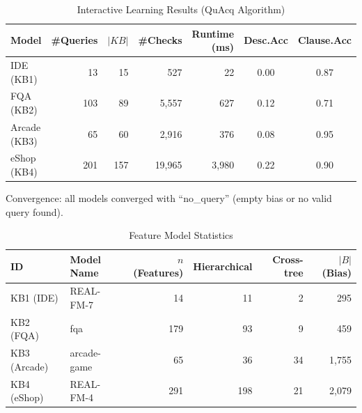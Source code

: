 \begin{table}[htbp]
\centering
\caption{Interactive Learning Results (QuAcq Algorithm)}
\label{tab:interactive}
\begin{tabular}{l|rrrr|cc}
\toprule
\textbf{Model} & \textbf{\#Queries} & \textbf{$|KB|$} & \textbf{\#Checks} & \textbf{Runtime (ms)}
    & \textbf{Desc.Acc} & \textbf{Clause.Acc} \\
\midrule
IDE (KB1)    & 13  & 15  & 527    & 22     & 0.00 & 0.87 \\
FQA (KB2)    & 103 & 89  & 5,557  & 627    & 0.12 & 0.71 \\
Arcade (KB3) & 65  & 60  & 2,916  & 376    & 0.08 & 0.95 \\
eShop (KB4)  & 201 & 157 & 19,965 & 3,980  & 0.22 & 0.90 \\
\bottomrule
\end{tabular}
\begin{flushleft}
\small Convergence: all models converged with ``no\_query'' (empty bias or no valid query found).
\end{flushleft}
\end{table}


\begin{table}[htbp]
\centering
\caption{Feature Model Statistics}
\label{tab:fm_stats}
\begin{tabular}{llrrrr}
\toprule
\textbf{ID} & \textbf{Model Name} & \textbf{$n$ (Features)} & \textbf{Hierarchical} & \textbf{Cross-tree} & \textbf{$|B|$ (Bias)} \\
\midrule
KB1 (IDE)    & REAL-FM-7    & 14   & 11    & 2     & 295    \\
KB2 (FQA)    & fqa          & 179  & 93    & 9     & 459    \\
KB3 (Arcade) & arcade-game  & 65   & 36    & 34    & 1,755  \\
KB4 (eShop)  & REAL-FM-4    & 291  & 198   & 21    & 2,079  \\
\bottomrule
\end{tabular}
\end{table}
